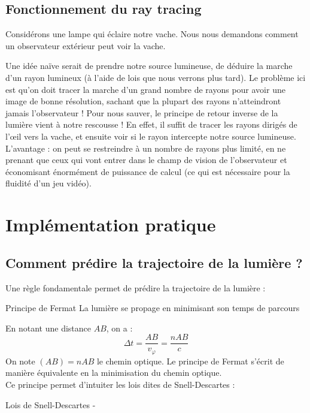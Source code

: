 \documentclass{cours}
\begin{document}
	\subsection{Fonctionnement du ray tracing}
	Considérons une lampe qui éclaire notre vache. Nous nous demandons comment un observateur extérieur peut voir la vache.
	
	
	Une idée naïve serait de prendre notre source lumineuse, de déduire la marche d'un rayon lumineux (à l'aide de lois que nous verrons plus tard).
	Le problème ici est qu'on doit tracer la marche d'un grand nombre de rayons pour avoir une image de bonne résolution, sachant que la plupart des rayons n'atteindront jamais l'observateur !
	Pour nous sauver, le principe de retour inverse de la lumière vient à notre rescousse ! En effet, il suffit de tracer les rayons dirigés de l'\oe il vers la vache, et ensuite voir si le rayon intercepte notre source lumineuse.
	L'avantage : on peut se restreindre à un nombre de rayons plus limité, en ne prenant que ceux qui vont entrer dans le champ de vision de l'observateur et économisant énormément de puissance de calcul (ce qui est nécessaire pour la fluidité d'un jeu vidéo).
	
	\section{Implémentation pratique}
	\subsection{Comment prédire la trajectoire de la lumière ?}
	Une règle fondamentale permet de prédire la trajectoire de la lumière :
	\begin{théorème}{Principe de Fermat}{}
	La lumière se propage en minimisant son temps de parcours
	\end{théorème}
	En notant une distance $AB$, on a :
	$$\Delta t = \frac{AB}{v_\varphi} = \frac{nAB}{c}$$
	On note $(AB) = nAB$ le chemin optique. Le principe de Fermat s'écrit de manière équivalente en la minimisation du chemin optique.\\
	Ce principe permet d'intuiter les lois dites de Snell-Descartes :
	\begin{propositionfr}{Lois de Snell-Descartes}
		- 
	\end{propositionfr}
	
\end{document}
